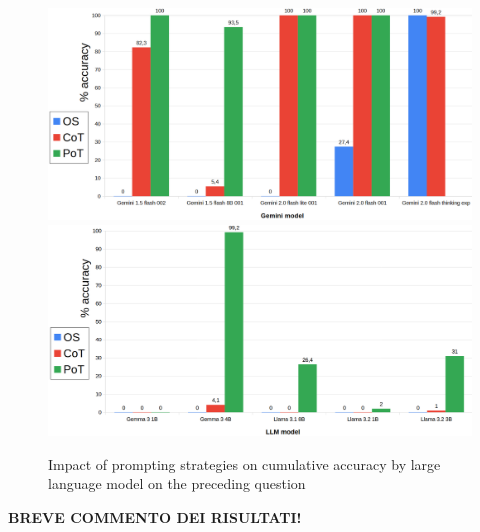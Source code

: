 \documentclass[12pt]{article}
\begin{document}
\begin{figure}[H]
    \centering
            \includegraphics[width=1\textwidth]{q103Gemini.png}
            \includegraphics[width=1\textwidth]{q103Other.png}
    \caption[Accuracy on Question 5 by LLM]{Impact of prompting strategies on cumulative accuracy by large language model on the preceding question}
    \end{figure} 
\textbf{BREVE COMMENTO DEI RISULTATI!}

\vspace{1cm}
\end{document}

